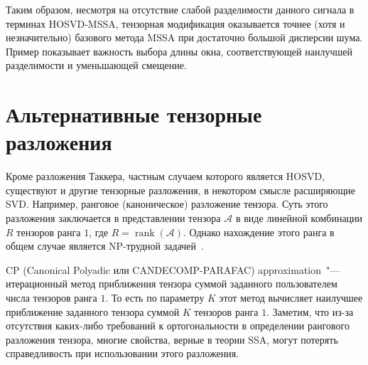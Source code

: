 \documentclass[specialist,
  substylefile=spbu.rtx,
subf,href,colorlinks=true, 12pt]{disser}
\theoremstyle{plain}
\theoremstyle{definition}
\theoremstyle{remark}
\begin{document}
Таким образом, несмотря на отсутствие слабой разделимости данного сигнала в терминах HOSVD-MSSA,
тензорная модификация оказывается точнее (хотя и незначительно) базового метода MSSA при достаточно большой дисперсии шума. Пример показывает важность выбора длины окна, соответствующей наилучшей разделимости и уменьшающей смещение.

\section{Альтернативные тензорные разложения}\label{sec:other-decomp}
Кроме разложения Таккера, частным случаем которого является HOSVD, существуют и другие тензорные разложения,
в некотором смысле расширяющие SVD.
Например, ранговое (каноническое) разложение тензора.
Суть этого разложения заключается в представлении тензора $\mathcal{A}$ в виде линейной комбинации $R$ тензоров
ранга $1$, где $R=\operatorname{rank}(\mathcal{A})$.
Однако нахождение этого ранга в общем случае является NP-трудной задачей~\cite{NP-hard}.

CP (Canonical Polyadic или CANDECOMP-PARAFAC) approximation~\cite{parafac1, parafac2}"--- итерационный метод
приближения тензора суммой заданного пользователем числа тензоров ранга $1$.
То есть по параметру $K$ этот метод вычисляет наилучшее приближение заданного тензора суммой $K$ тензоров ранга $1$.
Заметим, что из-за отсутствия каких-либо требований к ортогональности в определении рангового разложения тензора,
многие свойства, верные в теории SSA, могут потерять справедливость при использовании этого разложения.
\end{document}

